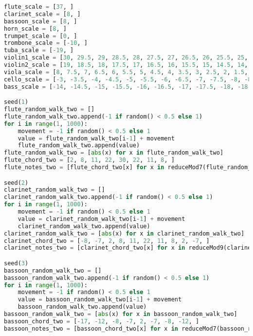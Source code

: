 \begin{lstlisting}[language=Python, caption=Tianshu Segment\_III]
flute_scale = [37, ]
clarinet_scale = [8, ]
bassoon_scale = [8, ]
horn_scale = [8, ]
trumpet_scale = [0, ]
trombone_scale = [-10, ]
tuba_scale = [-19, ]
violin1_scale = [30, 29.5, 29, 28.5, 28, 27.5, 27, 26.5, 26, 25.5, 25, 24.5, 24, 23.5, 23, 22.5, 22, 21.5, 21, 20.5, 20, 19.5, 19, 19.5, 20, 20.5, 21, 21.5, 22, 22.5, 23, 23.5, 24, 24.5, 25, 25.5, 26, 26.5, 27, 27.5, 28, 28.5, 29, 29.5, ]
violin2_scale = [19, 18.5, 18, 17.5, 17, 16.5, 16, 15.5, 15, 14.5, 14, 13.5, 13, 12.5, 12, 11.5, 11, 10.5, 10, 9.5, 9, 8.5, 8, 8.5, 9, 9.5, 10, 10.5, 11, 11.5, 12, 12.5, 13, 13.5, 14, 14.5, 15, 15.5, 16, 16.5, 17, 17.5, 18, 18.5, ]
viola_scale = [8, 7.5, 7, 6.5, 6, 5.5, 5, 4.5, 4, 3.5, 3, 2.5, 2, 1.5, 1, 0.5, 0, -0.5, -1, -1.5, -2, -2.5, -3, -2.5, -2, -1.5, -1, -0.5, 0, 0.5, 1, 1.5, 2, 2.5, 3, 3.5, 4, 4.5, 5, 5.5, 6, 6.5, 7, 7.5, ]
cello_scale = [-3, -3.5, -4, -4.5, -5, -5.5, -6, -6.5, -7, -7.5, -8, -8.5, -9, -9.5, -10, -10.5, -11, -11.5, -12, -12.5 -13, -13.5 -14, -13.5, -13, -12.5, -12, -11.5, -11, -10.5, -10, -9.5, -9, -8.5, -8, -7.5, -7, -6.5, -6, -5.5, -5, -4.5, -4, -3.5, ]
bass_scale = [-14, -14.5, -15, -15.5, -16, -16.5, -17, -17.5, -18, -18.5, -19, -19.5, -20, -20.5, -21, -21.5, -22, -22.5, -23, -23.5, -24, -24.5, -25, -24.5, -24, -23.5, -23, -22.5, -22, -21.5, -21, -20.5, -20, -19.5, -19, -18.5, -18, -17.5, -17, -16.5, -16, -15.5, -15, -14.5, ]

seed(1)
flute_random_walk_two = []
flute_random_walk_two.append(-1 if random() < 0.5 else 1)
for i in range(1, 1000):
    movement = -1 if random() < 0.5 else 1
    value = flute_random_walk_two[i-1] + movement
    flute_random_walk_two.append(value)
flute_random_walk_two = [abs(x) for x in flute_random_walk_two]
flute_chord_two = [2, 8, 11, 22, 30, 22, 11, 8, ]
flute_notes_two = [flute_chord_two[x] for x in reduceMod7(flute_random_walk_two)]

seed(2)
clarinet_random_walk_two = []
clarinet_random_walk_two.append(-1 if random() < 0.5 else 1)
for i in range(1, 1000):
    movement = -1 if random() < 0.5 else 1
    value = clarinet_random_walk_two[i-1] + movement
    clarinet_random_walk_two.append(value)
clarinet_random_walk_two = [abs(x) for x in clarinet_random_walk_two]
clarinet_chord_two = [-8, -7, 2, 8, 11, 22, 11, 8, 2, -7, ]
clarinet_notes_two = [clarinet_chord_two[x] for x in reduceMod9(clarinet_random_walk_two)]

seed(3)
bassoon_random_walk_two = []
bassoon_random_walk_two.append(-1 if random() < 0.5 else 1)
for i in range(1, 1000):
    movement = -1 if random() < 0.5 else 1
    value = bassoon_random_walk_two[i-1] + movement
    bassoon_random_walk_two.append(value)
bassoon_random_walk_two = [abs(x) for x in bassoon_random_walk_two]
bassoon_chord_two = [-17, -12, -8, -7, 2, -7, -8, -12, ]
bassoon_notes_two = [bassoon_chord_two[x] for x in reduceMod7(bassoon_random_walk_two)]


\end{lstlisting}
